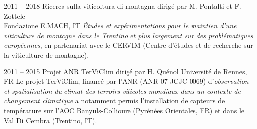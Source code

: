 \documentclass[]{cv-etienne}
\begin{document}
\begin{entrylist}
\entry
{2011 -- 2018}
{Ricerca sulla viticoltura di montagna  {\normalfont  dirigé par M. Pontalti et F. Zottele \\}}
{ Fondazione E.MACH, IT}
{\emph{Études et expérimentations pour le maintien d'une viticulture de montagne dans le Trentino et plus largement sur des problématiques européennes}, en partenariat avec le CERVIM  (Centre d'études et de recherche sur la viticulture de montagne).}
\end{entrylist}
\begin{entrylist}
\entry
{2011 -- 2015}
{Projet ANR TerViClim {\normalfont dirigé par H. Quénol}}
{ Université de Rennes, FR}
{Le projet TerViClim, financé par l'ANR (ANR-07-JCJC-0069) d'\emph{observation et spatialisation du climat des terroirs viticoles mondiaux dans un contexte de changement climatique} a notamment permis l'installation de capteurs de température sur l'AOC Banyuls-Collioure (Pyrénées Orientales, FR) et dans le Val Di Cembra (Trentino, IT).}
\end{entrylist}
\end{document}
